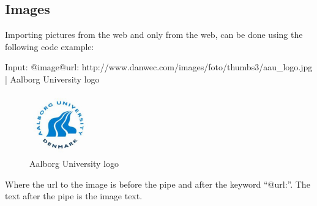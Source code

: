 \subsection*{Images}
Importing pictures from the web and only from the web, can be done using the following code example:

\begin{spverbatim}
Input: @image{@url: http://www.danwec.com/images/foto/thumbs3/aau_logo.jpg  | Aalborg University logo}
\end{spverbatim}

\begin{figure}[! h]
\centering
	 \includegraphics[width=100px]{images/aau_logo.jpg}
		 \caption{Aalborg University logo}	
	\label{fig:Imageimport}
\end{figure}

Where the url to the image is before the pipe and after the keyword ``@url:''. The text after the pipe is the image text.